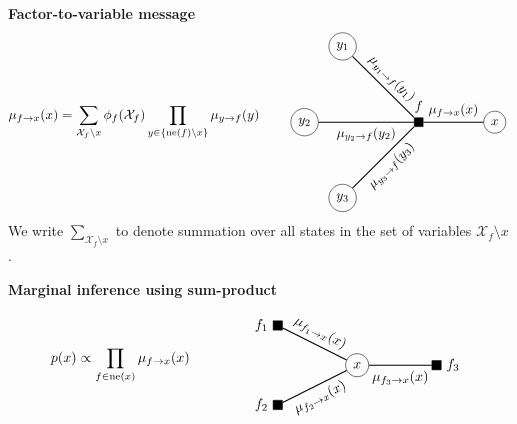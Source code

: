 \documentclass{article}
\begin{document}
\begin{theorem}
    \textbf{Factor-to-variable message} 
    \begin{equation*}
        \begin{aligned}
            \mu_{f \rightarrow x}(x) = \sum_{\mathcal{X}_f\text{\textbackslash} x} \phi_f(\mathcal{X}_f) \prod_{y \in \{\text{ne}(f)\text{\textbackslash}x\}} \mu_{y \rightarrow f}(y)
        \end{aligned}
        \qquad
        \vcenter{\hbox{
        \begin{tikzpicture}
            \node[rectangle, draw, fill=black, label=above:{$f$}] at (0, 0)   (f) {};
            \node[circle, draw] at (-2, 2)   (y1) {$y_1$};
            \node[circle, draw] at (-3, 0)   (y2) {$y_2$};
            \node[circle, draw] at (-2, -2)  (y3) {$y_3$};

            \node[circle, draw] at (2, 0)   (x) {$x$};
            
            \draw [thick] (y1) -- (f) node [midway,sloped, above, draw=none] {$\mu_{y_1 \rightarrow f}(y_1)$};
            \draw [thick] (y2) -- (f) node [midway,sloped, below, draw=none] {$\mu_{y_2 \rightarrow f}(y_2)$};
            \draw [thick] (y3) -- (f) node [midway,sloped, below, draw=none] {$\mu_{y_3 \rightarrow f}(y_3)$};
            \draw [thick] (f) -- (x) node [midway,sloped, above, draw=none] {$\mu_{f \rightarrow x}(x)$};
        \end{tikzpicture}
        }}
    \end{equation*}
    We write $\sum_{\mathcal{X}_f\text{\textbackslash} x}$ to denote summation over all states in the set of variables $\mathcal{X}_f\text{\textbackslash} x$.
\end{theorem}

\begin{theorem}
    \textbf{Marginal inference using sum-product} 
    \begin{equation*}
        \begin{aligned}
            p(x) \propto \prod_{f \in \text{ne}(x)} \mu_{f \rightarrow x}(x)
        \end{aligned}
        \qquad\qquad
        \vcenter{\hbox{
        \begin{tikzpicture}
            \node[circle, draw] at (0, 0)   (x) {$x$};
            \node[rectangle, draw, fill=black, label=left:{$f_1$}] at (-2, 1)   (f1) {};
            \node[rectangle, draw, fill=black, label=left:{$f_2$}] at (-2, -1)   (f2) {};
            \node[rectangle, draw, fill=black, label=right:{$f_3$}] at (2, 0)   (f3) {};
            
            \draw [thick] (f1) -- (x) node [midway,sloped, above, draw=none] {$\mu_{f_1 \rightarrow x}(x)$};
            \draw [thick] (f2) -- (x) node [midway,sloped, below, draw=none] {$\mu_{f_2 \rightarrow x}(x)$};
            \draw [thick] (f3) -- (x) node [midway,sloped, below, draw=none] {$\mu_{f_3 \rightarrow x}(x)$};
        \end{tikzpicture}
        }}
    \end{equation*}
\end{theorem}
\end{document}
